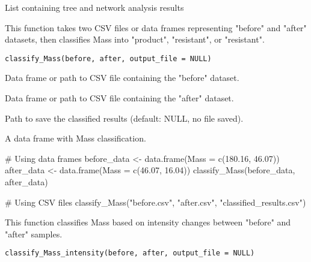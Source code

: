 \documentclass[a4paper]{book}
\begin{document}
%
\begin{Value}
List containing tree and network analysis results
\end{Value}
%
\begin{Description}
This function takes two CSV files or data frames representing "before" and "after" datasets,
then classifies Mass into "product", "resistant", or "resistant".
\end{Description}
%
\begin{Usage}
\begin{verbatim}
classify_Mass(before, after, output_file = NULL)
\end{verbatim}
\end{Usage}
%
\begin{Arguments}
\begin{ldescription}
\item[\code{before}] Data frame or path to CSV file containing the "before" dataset.

\item[\code{after}] Data frame or path to CSV file containing the "after" dataset.

\item[\code{output\_file}] Path to save the classified results (default: NULL, no file saved).
\end{ldescription}
\end{Arguments}
%
\begin{Value}
A data frame with Mass classification.
\end{Value}
%
\begin{Examples}
\begin{ExampleCode}
# Using data frames
before_data <- data.frame(Mass = c(180.16, 46.07))
after_data <- data.frame(Mass = c(46.07, 16.04))
classify_Mass(before_data, after_data)

# Using CSV files
classify_Mass("before.csv", "after.csv", "classified_results.csv")
\end{ExampleCode}
\end{Examples}
%
\begin{Description}
This function classifies Mass based on intensity changes between "before" and "after" samples.
\end{Description}
%
\begin{Usage}
\begin{verbatim}
classify_Mass_intensity(before, after, output_file = NULL)
\end{verbatim}
\end{Usage}
\end{document}
